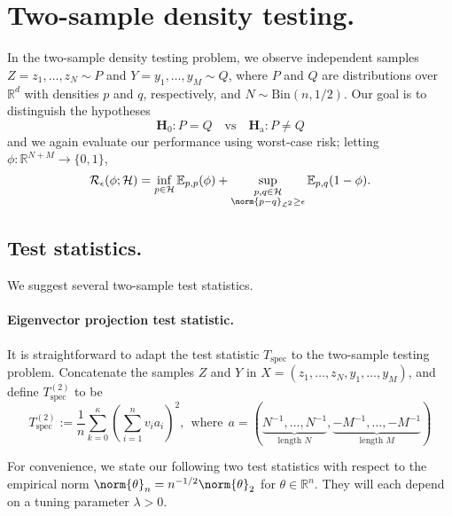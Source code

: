 \documentclass{article}
\newcommand{\Reals}{\mathbb{R}}
\newcommand{\1}{\mathbf{1}}
\newcommand{\Leb}{\mathcal{L}}
\newcommand{\Ebb}{\mathbb{E}}
\theoremstyle{alden}
\theoremstyle{aldenthm}
\theoremstyle{definition}
\theoremstyle{remark}
\begin{document}
\section{Two-sample density testing.}
In the two-sample density testing problem, we observe independent samples $Z = z_1,\ldots,z_N \sim P$ and $Y = y_1,\ldots,y_M \sim Q$, where $P$ and $Q$ are distributions over $\Reals^d$ with densities $p$ and $q$, respectively, and $N \sim \textrm{Bin}(n,1/2)$. Our goal is to distinguish the hypotheses
\begin{equation*}
\mathbf{H}_0: P = Q \quad \textrm{vs} \quad \mathbf{H}_{\textrm{a}}: P \neq Q
\end{equation*}
and we again evaluate our performance using worst-case risk; letting $\phi:\Reals^{N + M} \to \{0,1\}$, 
\begin{equation*}
\mathcal{R}_{\epsilon}(\phi; \mathcal{H}) = \inf_{p \in \mathcal{H}}\Ebb_{p,p}(\phi) + \sup_{\substack{p,q \in \mathcal{H} \\ \norm{p - q}_{\Leb^2} \geq \epsilon}} \Ebb_{p,q}(1 - \phi).
\end{equation*}

\subsection{Test statistics.}

We suggest several two-sample test statistics. 

\paragraph{Eigenvector projection test statistic.}

It is straightforward to adapt the test statistic $T_{\mathrm{spec}}$ to the two-sample testing problem. Concatenate the samples $Z$ and $Y$ in $X = (z_1,\ldots,z_N,y_1,\ldots,y_M)$, and define $T_{\mathrm{spec}}^{(2)}$ to be
\begin{equation}
\label{eqn:graph_spectral_projections_2}
T_{\mathrm{spec}}^{(2)} := \frac{1}{n} \sum_{k = 0}^{\kappa} \left(\sum_{i = 1}^{n} v_i a_i\right)^2, ~~\textrm{where}~~ a = (\underbrace{N^{-1},\ldots,{N^{-1}}}_{\textrm{length } N},\underbrace{-M^{-1},\ldots,-M^{-1}}_{\textrm{length } M})
\end{equation}

For convenience, we state our following two test statistics with respect to the empirical norm $\norm{\theta}_n = n^{-1/2}\norm{\theta}_2$ for $\theta \in \Reals^n$. They will each depend on a tuning parameter $\lambda > 0$.
\end{document}
